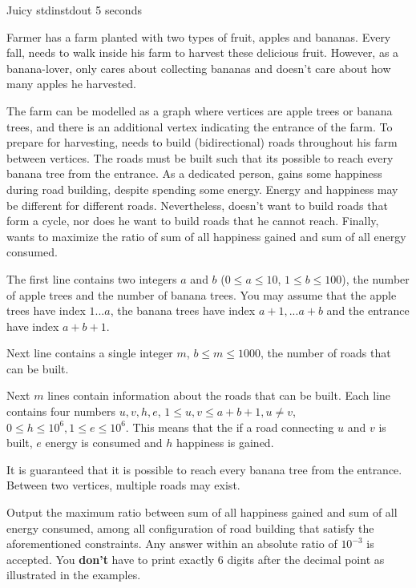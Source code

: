\begin{problem}{Juicy}
{stdin}{stdout}
{5 seconds}{}{}

Farmer \pittoresque has a farm planted with two types of fruit, apples and bananas. Every fall, \pittoresque needs to walk inside his farm to harvest these delicious fruit. However, as a banana-lover, \pittoresque only cares about collecting bananas and doesn't care about how many apples he harvested. 

The farm can be modelled as a graph where vertices are apple trees or banana trees, and there is an additional vertex indicating the entrance of the farm. To prepare for harvesting, \pittoresque needs to build (bidirectional) roads throughout his farm between vertices. The roads must be built such that its possible to reach every banana tree from the entrance. As a dedicated person, \pittoresque gains some happiness during road building, despite spending some energy. Energy and happiness may be different for different roads. Nevertheless, \pittoresque doesn't want to build roads that form a cycle, nor does he want to build roads that he cannot reach. Finally, \pittoresque wants to maximize the ratio of sum of all happiness gained and sum of all energy consumed.

\InputFile

The first line contains two integers $a$ and $b$ ($0 \le a \le 10$, $1 \le b \le 100$), the number of apple trees and the number of banana trees. You may assume that the apple trees have index $1 ... a$, the banana trees have index $a + 1, ... a + b$ and the entrance have index $a + b + 1$.

Next line contains a single integer $m$, $b \leq m \leq 1000$, the number of roads that can be built.

Next $m$ lines contain information about the roads that can be built. Each line contains four numbers $u, v, h, e$, $1 \le u, v \le a + b + 1, u \neq v$, $0 \le h \le 10^6, 1 \le e \le 10^6$. This means that the if a road connecting $u$ and $v$ is built, $e$ energy is consumed and $h$ happiness is gained.

It is guaranteed that it is possible to reach every banana tree from the entrance. Between two vertices, multiple roads may exist.

\OutputFile

Output the maximum ratio between sum of all happiness gained and sum of all energy consumed, among all configuration of road building that satisfy the aforementioned constraints. Any answer within an absolute ratio of $10^{-3}$ is accepted. You \textbf{don't} have to print exactly 6 digits after the decimal point as illustrated in the examples.

\newpage

\Examples

\begin{example}
%
\end{example}

\begin{example}
%
\end{example}



\end{problem}